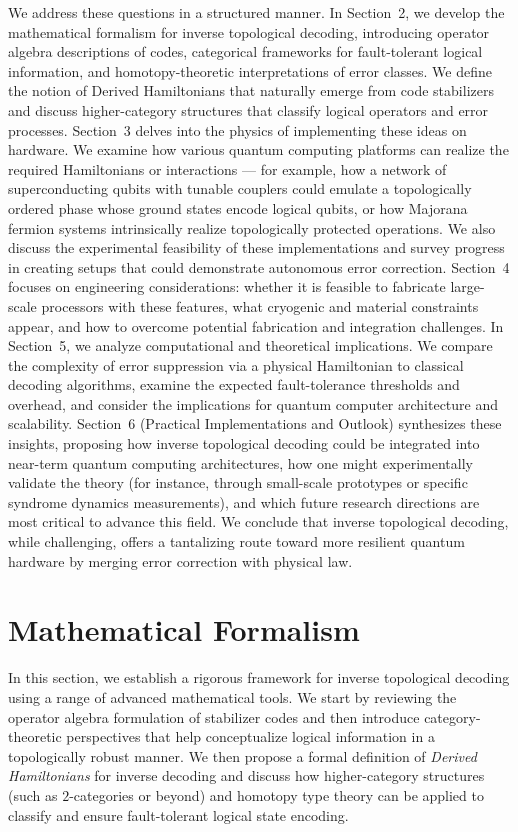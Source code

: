 \documentclass[11pt]{article}
\begin{document}
We address these questions in a structured manner. In Section~2, we develop the mathematical formalism for inverse topological decoding, introducing operator algebra descriptions of codes, categorical frameworks for fault-tolerant logical information, and homotopy-theoretic interpretations of error classes. We define the notion of Derived Hamiltonians that naturally emerge from code stabilizers and discuss higher-category structures that classify logical operators and error processes. Section~3 delves into the physics of implementing these ideas on hardware. We examine how various quantum computing platforms can realize the required Hamiltonians or interactions --- for example, how a network of superconducting qubits with tunable couplers could emulate a topologically ordered phase whose ground states encode logical qubits, or how Majorana fermion systems intrinsically realize topologically protected operations. We also discuss the experimental feasibility of these implementations and survey progress in creating setups that could demonstrate autonomous error correction. Section~4 focuses on engineering considerations: whether it is feasible to fabricate large-scale processors with these features, what cryogenic and material constraints appear, and how to overcome potential fabrication and integration challenges. In Section~5, we analyze computational and theoretical implications. We compare the complexity of error suppression via a physical Hamiltonian to classical decoding algorithms, examine the expected fault-tolerance thresholds and overhead, and consider the implications for quantum computer architecture and scalability. Section~6 (Practical Implementations and Outlook) synthesizes these insights, proposing how inverse topological decoding could be integrated into near-term quantum computing architectures, how one might experimentally validate the theory (for instance, through small-scale prototypes or specific syndrome dynamics measurements), and which future research directions are most critical to advance this field. We conclude that inverse topological decoding, while challenging, offers a tantalizing route toward more resilient quantum hardware by merging error correction with physical law.

\section{Mathematical Formalism}
In this section, we establish a rigorous framework for inverse topological decoding using a range of advanced mathematical tools. We start by reviewing the operator algebra formulation of stabilizer codes and then introduce category-theoretic perspectives that help conceptualize logical information in a topologically robust manner. We then propose a formal definition of \emph{Derived Hamiltonians} for inverse decoding and discuss how higher-category structures (such as $2$-categories or beyond) and homotopy type theory can be applied to classify and ensure fault-tolerant logical state encoding.
\end{document}
